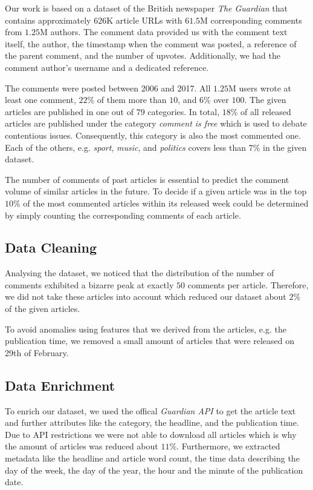 Our work is based on a dataset of the British newspaper \textit{The Guardian} that contains approximately $626$K article URLs with $61.5$M corresponding comments from $1.25$M authors. 
The comment data provided us with the comment text itself, the author, the timestamp when the comment was posted, a reference of the parent comment, and the number of upvotes. Additionally, we had the comment author's username and a dedicated reference. 

The comments were posted between 2006 and 2017. All $1.25$M users wrote at least one comment, $22$\% of them more than $10$, and $6$\% over $100$.
The given articles are published in one out of $79$ categories. In total, $18$\% of all released articles are published under the category \textit{comment is free} which is used to debate contentious issues. Consequently, this category is also the most commented one. 
Each of the others, e.g. \textit{sport}, \textit{music}, and \textit{politics} covers less than $7$\% in the given dataset.

The number of comments of past articles is essential to predict the comment volume of similar articles in the future. 
To decide if a given article was in the top $10$\% of the most commented articles within its released week could be determined by simply counting the corresponding comments of each article.

\subsection{Data Cleaning}
Analysing the dataset, we noticed that the distribution of the number of comments exhibited a bizarre peak at exactly $50$ comments per article. Therefore, we did not take these articles into account which reduced our dataset about $2$\% of the given articles.

To avoid anomalies using features that we derived from the articles, e.g. the publication time, we removed a small amount of articles that were released on 29th of February.

\subsection{Data Enrichment}
To enrich our dataset, we used the offical \textit{Guardian API} to get the article text and further attributes like the category, the headline, and the publication time.
Due to API restrictions we were not able to download all articles which is why the amount of articles was reduced about $11$\%.
Furthermore, we extracted metadata like the headline and article word count, the time data describing the day of the week, the day of the year, the hour and the minute of the publication date.

